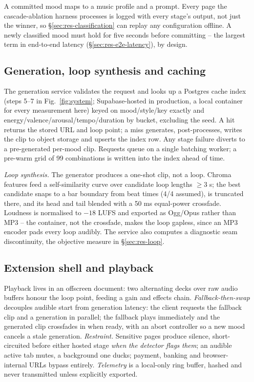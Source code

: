 \documentclass[conference]{IEEEtran}
\begin{document}
A committed mood maps to a music profile and a prompt. Every page the
cascade-ablation harness processes is logged with every stage's output, not
just the winner, so \S\ref{sec:res-classification} can replay any
configuration offline. A newly classified mood must hold for five seconds
before committing -- the largest term in end-to-end latency
(\S\ref{sec:res-e2e-latency}), by design.

\subsection{Generation, loop synthesis and caching}

The generation service validates the request and looks up a Postgres
cache index (steps 5--7 in Fig.~\ref{fig:system}; Supabase-hosted in
production, a local container for every measurement here) keyed on
mood/style/key exactly and energy/valence/arousal/tempo/duration by
bucket, excluding the seed. A hit returns the stored URL and loop point;
a miss generates, post-processes, writes the clip to object storage and
upserts the index row. Any stage failure diverts to a pre-generated
per-mood clip. Requests queue on a single batching worker; a pre-warm
grid of 99 combinations is written into the index ahead of time.

\emph{Loop synthesis.} The generator produces a one-shot clip, not a
loop. Chroma features feed a self-similarity curve \cite{foote} over
candidate loop lengths $\geq 3$ s; the best candidate snaps to a bar
boundary from beat times \cite{librosa} (4/4 assumed), is truncated
there, and its head and tail blended with a 50 ms equal-power crossfade.
Loudness is normalised to $-18$ LUFS \cite{ebu128} and exported as
Ogg/Opus \cite{opus} rather than MP3 -- the container, not the crossfade,
makes the loop gapless, since an MP3 encoder pads every loop audibly. The
service also computes a diagnostic seam discontinuity, the objective
measure in \S\ref{sec:res-loop}.

\subsection{Extension shell and playback}

Playback lives in an offscreen document: two alternating decks over raw
audio buffers honour the loop point, feeding a gain and effects chain.
\emph{Fallback-then-swap} decouples audible start from generation
latency: the client requests the fallback clip and a generation in
parallel; the fallback plays immediately and the generated clip
crossfades in when ready, with an abort controller so a new mood cancels
a stale generation. \emph{Restraint.} Sensitive pages produce silence,
short-circuited before either hosted stage \emph{when the detector flags
them}; an audible active tab mutes, a background one ducks; payment,
banking and browser-internal URLs bypass entirely. \emph{Telemetry} is
a local-only ring buffer, hashed and never transmitted unless explicitly
exported.
\end{document}
